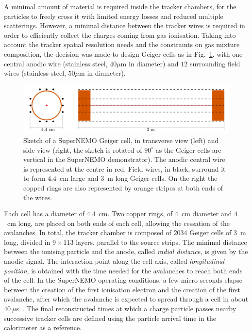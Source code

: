 A minimal amount of material is required inside the tracker chambers, for the particles to freely cross it with limited energy losses and reduced multiple scatterings.
However, a minimal distance between the tracker wires is required in order to efficiently collect the charges coming from gas ionisation.
Taking into account the tracker spatial resolution needs and the constraints on gas mixture composition, the decision was made to design Geiger cells as in Fig.~\ref{fig:SN_geiger_cell}, with one central anodic wire (stainless steel, $40\mu$m in diameter) and $12$ surrounding field wires (stainless steel, $50\mu$m in diameter).
\begin{figure}[h!]
\centering
\includegraphics[width=1\textwidth]{SNdemonstrator/fig_SNdemonstrator/geiger_cell.pdf}
\caption{Sketch of a SuperNEMO Geiger cell, in transverse view (left) and side view (right, the sketch is rotated of $90^{\circ}$ as the Geiger cells are vertical in the SuperNEMO demonstrator).
  The anodic central wire is represented at the centre in red.
  Field wires, in black, surround it to form $4.4$~cm large and $3$~m long Geiger cells.
  On the right the copped rings are also represented by orange stripes at both ends of the wires.
\label{fig:SN_geiger_cell}}
\end{figure}
Each cell has a diameter of $4.4$~cm.
Two copper rings, of $4$~cm diameter and $4$~cm long, are placed on both ends of each cell, allowing the cessation of the avalanches.
In total, the tracker chamber is composed of $2034$ Geiger cells of $3$~m long, divided in $9\times113$ layers, parallel to the source strips.
The minimal distance between the ionising particle and the anode, called \emph{radial distance}, is given by the anodic signal.
The interaction point along the cell axis, called \emph{longitudinal position}, is obtained with the time needed for the avalanches to reach both ends of the cell.
In the SuperNEMO operating conditions, a few micro seconds elapse between the creation of the first ionisation electron and the creation of the first avalanche, after which the avalanche is expected to spread through a cell in about $40~\mu$s~\cite{docdb:ashwin2015}.
The final reconstructed times at which a charge particle passes nearby successive tracker cells are defined using the particle arrival time in the calorimeter as a reference.

